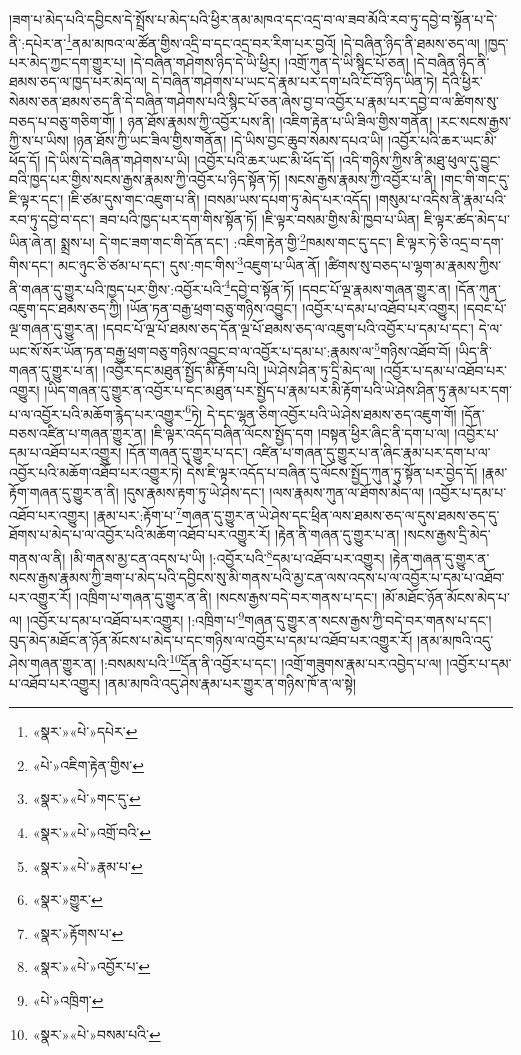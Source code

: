 །ཟག་པ་མེད་པའི་དབྱིངས་དེ་སྤྲོས་པ་མེད་པའི་ཕྱིར་ནམ་མཁའ་དང་འདྲ་བ་ལ་ཟབ་མོའི་རབ་ཏུ་དབྱེ་བ་སྟོན་པ་དེ་ནི་:དཔེར་ན་\footnote{«སྣར་»«པེ་»དཔེར་}ནམ་མཁའ་ལ་ཚོན་གྱིས་འདྲི་བ་དང་འདྲ་བར་རིག་པར་བྱའོ། །དེ་བཞིན་ཉིད་ནི་ཐམས་ཅད་ལ། །ཁྱད་པར་མེད་ཀྱང་དག་གྱུར་པ། །དེ་བཞིན་གཤེགས་ཉིད་དེ་ཡི་ཕྱིར། །འགྲོ་ཀུན་དེ་ཡི་སྙིང་པོ་ཅན། །དེ་བཞིན་ཉིད་ནི་ཐམས་ཅད་ལ་ཁྱད་པར་མེད་ལ། དེ་བཞིན་གཤེགས་པ་ཡང་དེ་རྣམ་པར་དག་པའི་ངོ་བོ་ཉིད་ཡིན་ཏེ། དེའི་ཕྱིར་སེམས་ཅན་ཐམས་ཅད་ནི་དེ་བཞིན་གཤེགས་པའི་སྙིང་པོ་ཅན་ཞེས་བྱ་བ་འབྱོར་པ་རྣམ་པར་དབྱེ་བ་ལ་ཚིགས་སུ་བཅད་པ་བཅུ་གཅིག་གོ། །
ཉན་ཐོས་རྣམས་ཀྱི་འབྱོར་པས་ནི། །འཇིག་རྟེན་པ་ཡི་ཟིལ་གྱིས་གནོན། །རང་སངས་རྒྱས་ཀྱི་ས་པ་ཡིས། །ཉན་ཐོས་ཀྱི་ཡང་ཟིལ་གྱིས་གནོན། །དེ་ཡིས་བྱང་ཆུབ་སེམས་དཔའ་ཡི། །འབྱོར་པའི་ཆར་ཡང་མི་ཕོད་དོ། །དེ་ཡིས་དེ་བཞིན་གཤེགས་པ་ཡི། །འབྱོར་པའི་ཆར་ཡང་མི་ཕོད་དོ། །འདི་གཉིས་ཀྱིས་ནི་མཐུ་ཕུལ་དུ་བྱུང་བའི་ཁྱད་པར་གྱིས་སངས་རྒྱས་རྣམས་ཀྱི་འབྱོར་པ་ཉིད་སྟོན་ཏོ། །སངས་རྒྱས་རྣམས་ཀྱི་འབྱོར་པ་ནི། །གང་གི་གང་དུ་ཇི་ལྟར་དང་། །ཇི་ཙམ་དུས་གང་འཇུག་པ་ནི། །བསམ་ཡས་དཔག་ཏུ་མེད་པར་འདོད། །གསུམ་པ་འདིས་ནི་རྣམ་པའི་རབ་ཏུ་དབྱེ་བ་དང་། ཟབ་པའི་ཁྱད་པར་དག་གིས་སྟོན་ཏོ། །ཇི་ལྟར་བསམ་གྱིས་མི་ཁྱབ་པ་ཡིན། ཇི་ལྟར་ཚད་མེད་པ་ཡིན་ཞེ་ན། སྨྲས་པ། དེ་གང་ཟག་གང་གི་དོན་དང་། :འཇིག་རྟེན་གྱི་\footnote{«པེ་»འཇིག་རྟེན་གྱིས་}ཁམས་གང་དུ་དང་། ཇི་ལྟར་ཏེ་ཅི་འདྲ་བ་དག་གིས་དང་། མང་ཉུང་ཅི་ཙམ་པ་དང་། དུས་:གང་གིས་\footnote{«སྣར་»«པེ་»གང་དུ་}འཇུག་པ་ཡིན་ནོ། །ཚིགས་སུ་བཅད་པ་ལྷག་མ་རྣམས་ཀྱིས་ནི་གཞན་དུ་གྱུར་པའི་ཁྱད་པར་གྱིས་:འབྱོར་པའི་\footnote{«སྣར་»«པེ་»འགྲོ་བའི་}དབྱེ་བ་སྟོན་ཏོ། །དབང་པོ་ལྔ་རྣམས་གཞན་གྱུར་ན། །དོན་ཀུན་འཇུག་དང་ཐམས་ཅད་ཀྱི། །ཡོན་ཏན་བརྒྱ་ཕྲག་བཅུ་གཉིས་འབྱུང་། །འབྱོར་པ་དམ་པ་འཐོབ་པར་འགྱུར། །དབང་པོ་ལྔ་གཞན་དུ་གྱུར་ན། །དབང་པོ་ལྔ་པོ་ཐམས་ཅད་དོན་ལྔ་པོ་ཐམས་ཅད་ལ་འཇུག་པའི་འབྱོར་པ་དམ་པ་དང་། དེ་ལ་ཡང་སོ་སོར་ཡོན་ཏན་བརྒྱ་ཕྲག་བཅུ་གཉིས་འབྱུང་བ་ལ་འབྱོར་པ་དམ་པ་:རྣམས་ལ་\footnote{«སྣར་»«པེ་»རྣམ་པ་}གཉིས་འཐོབ་བོ། །ཡིད་ནི་གཞན་དུ་གྱུར་པ་ན། །འབྱོར་དང་མཐུན་སྤྱོད་མི་རྟོག་པའི། །ཡེ་ཤེས་ཤིན་ཏུ་དྲི་མེད་ལ། །འབྱོར་པ་དམ་པ་འཐོབ་པར་འགྱུར། །ཡིད་གཞན་དུ་གྱུར་ན་འབྱོར་པ་དང་མཐུན་པར་སྤྱོད་པ་རྣམ་པར་མི་རྟོག་པའི་ཡེ་ཤེས་ཤིན་ཏུ་རྣམ་པར་དག་པ་ལ་འབྱོར་པའི་མཆོག་རྙེད་པར་འགྱུར་\footnote{«སྣར་»གྱུར་}ཏེ། དེ་དང་ལྷན་ཅིག་འབྱོར་པའི་ཡེ་ཤེས་ཐམས་ཅད་འཇུག་གོ། །དོན་བཅས་འཛིན་པ་གཞན་གྱུར་ན། །ཇི་ལྟར་འདོད་བཞིན་ལོངས་སྤྱོད་དག །བསྟན་ཕྱིར་ཞིང་ནི་དག་པ་ལ། །འབྱོར་པ་དམ་པ་འཐོབ་པར་འགྱུར། །དོན་གཞན་དུ་གྱུར་པ་དང་། འཛིན་པ་གཞན་དུ་གྱུར་པ་ན་ཞིང་རྣམ་པར་དག་པ་ལ་འབྱོར་པའི་མཆོག་འཐོབ་པར་འགྱུར་ཏེ། དེས་ཇི་ལྟར་འདོད་པ་བཞིན་དུ་ལོངས་སྤྱོད་ཀུན་ཏུ་སྟོན་པར་བྱེད་དོ། །རྣམ་རྟོག་གཞན་དུ་གྱུར་ན་ནི། །དུས་རྣམས་རྟག་ཏུ་ཡེ་ཤེས་དང་། །ལས་རྣམས་ཀུན་ལ་ཐོགས་མེད་ལ། །འབྱོར་པ་དམ་པ་འཐོབ་པར་འགྱུར། །རྣམ་པར་:རྟོག་པ་\footnote{«སྣར་»རྟོགས་པ་}གཞན་དུ་གྱུར་ན་ཡེ་ཤེས་དང་ཕྲིན་ལས་ཐམས་ཅད་ལ་དུས་ཐམས་ཅད་དུ་ཐོགས་པ་མེད་པ་ལ་འབྱོར་པའི་མཆོག་འཐོབ་པར་འགྱུར་རོ། །རྟེན་ནི་གཞན་དུ་གྱུར་པ་ན། །སངས་རྒྱས་དྲི་མེད་གནས་ལ་ནི། །མི་གནས་མྱ་ངན་འདས་པ་ཡི། །:འབྱོར་པའི་\footnote{«སྣར་»«པེ་»འབྱོར་པ་}དམ་པ་འཐོབ་པར་འགྱུར། །རྟེན་གཞན་དུ་གྱུར་ན་སངས་རྒྱས་རྣམས་ཀྱི་ཟག་པ་མེད་པའི་དབྱིངས་སུ་མི་གནས་པའི་མྱ་ངན་ལས་འདས་པ་ལ་འབྱོར་པ་དམ་པ་འཐོབ་པར་འགྱུར་རོ། །འཁྲིག་པ་གཞན་དུ་གྱུར་ན་ནི། །སངས་རྒྱས་བདེ་བར་གནས་པ་དང་། །མོ་མཐོང་ཉོན་མོངས་མེད་པ་ལ། །འབྱོར་པ་དམ་པ་འཐོབ་པར་འགྱུར། །:འཁྲིག་པ་\footnote{«པེ་»འཁྲིག་}གཞན་དུ་གྱུར་ན་སངས་རྒྱས་ཀྱི་བདེ་བར་གནས་པ་དང་། བུད་མེད་མཐོང་ན་ཉོན་མོངས་པ་མེད་པ་དང་གཉིས་ལ་འབྱོར་པ་དམ་པ་འཐོབ་པར་འགྱུར་རོ། །ནམ་མཁའི་འདུ་ཤེས་གཞན་གྱུར་ན། །:བསམས་པའི་\footnote{«སྣར་»«པེ་»བསམ་པའི་}དོན་ནི་འབྱོར་པ་དང་། །འགྲོ་གཟུགས་རྣམ་པར་འབྱེད་པ་ལ། །འབྱོར་པ་དམ་པ་འཐོབ་པར་འགྱུར། །ནམ་མཁའི་འདུ་ཤེས་རྣམ་པར་གྱུར་ན་གཉིས་ཁོ་ན་ལ་སྟེ། 